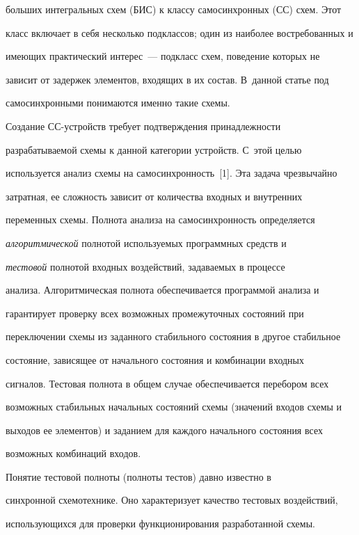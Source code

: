больших интегральных схем (БИС) к классу самосинхронных (СС) схем. Этот 


класс включает в себя несколько подклассов; один из наиболее востребованных и 


имеющих практический интерес~--- подкласс схем, поведение которых не 


зависит от задержек элементов, входящих в их состав. В~данной статье под 


самосинхронными понимаются именно такие схемы.


      


      Создание СС-устройств требует подтверждения принадлежности 


разрабатываемой схемы к данной категории устройств. С~этой целью 


используется анализ схемы на самосинхронность~[1]. Эта задача чрезвычайно 


затратная, ее сложность зависит от количества входных и внутренних 


переменных схемы. Полнота анализа на самосинхронность определяется 


\textit{алгоритмической} полнотой используемых программных средств и 


\textit{тестовой} полнотой входных воздействий, задаваемых в процессе 


анализа. Алгоритмическая полнота обеспечивается программой анализа и 


гарантирует проверку всех возможных промежуточных состояний при 


переключении схемы из заданного стабильного состояния в другое стабильное 


состояние, зависящее от начального состояния и комбинации входных 


сигналов. Тестовая полнота в общем случае обеспечивается перебором всех 


возможных стабильных начальных состояний схемы (значений входов схемы и 


выходов ее элементов) и заданием для каждого начального состояния всех 


возможных комбинаций входов.


      


      Понятие тестовой полноты (полноты тестов) давно известно в 


синхронной схемотехнике. Оно характеризует качество тестовых воздействий, 


исполь\-зу\-ющих\-ся для проверки функционирования разработанной схемы. 


